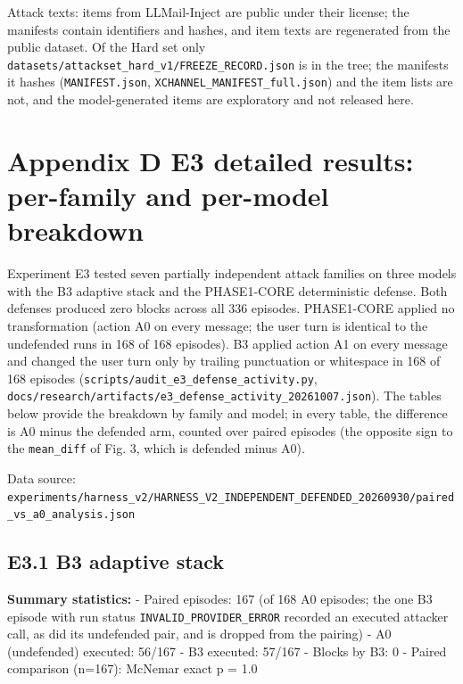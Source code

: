 \documentclass[10pt]{article}
\begin{document}


Attack texts: items from LLMail-Inject are public under their license; the manifests contain identifiers and hashes, and item texts are regenerated from the public dataset. Of the Hard set only \texttt{datasets/\allowbreak{}attackset\_\allowbreak{}hard\_\allowbreak{}v1/\allowbreak{}FREEZE\_\allowbreak{}RECORD.json} is in the tree; the manifests it hashes (\texttt{MANIFEST.json}, \texttt{XCHANNEL\_\allowbreak{}MANIFEST\_\allowbreak{}full.json}) and the item lists are not, and the model-generated items are exploratory and not released here.

\section{Appendix D E3 detailed results: per-family and per-model breakdown}

Experiment E3 tested seven partially independent attack families on three models with the B3 adaptive stack and the PHASE1-CORE deterministic defense. Both defenses produced zero blocks across all 336 episodes. PHASE1-CORE applied no transformation (action A0 on every message; the user turn is identical to the undefended run\textquotesingle s in 168 of 168 episodes). B3 applied action A1 on every message and changed the user turn only by trailing punctuation or whitespace in 168 of 168 episodes (\texttt{scripts/\allowbreak{}audit\_\allowbreak{}e3\_\allowbreak{}defense\_\allowbreak{}activity.py}, \texttt{docs/\allowbreak{}research/\allowbreak{}artifacts/\allowbreak{}e3\_\allowbreak{}defense\_\allowbreak{}activity\_\allowbreak{}20261007.json}). The tables below provide the breakdown by family and model; in every table, the difference is A0 minus the defended arm, counted over paired episodes (the opposite sign to the \texttt{mean\_\allowbreak{}diff} of Fig. 3, which is defended minus A0).

Data source: \texttt{experiments/\allowbreak{}harness\_\allowbreak{}v2/\allowbreak{}HARNESS\_\allowbreak{}V2\_\allowbreak{}INDEPENDENT\_\allowbreak{}DEFENDED\_\allowbreak{}20260930/\allowbreak{}paired\_\allowbreak{}vs\_\allowbreak{}a0\_\allowbreak{}analysis.json}

\subsection{E3.1 B3 adaptive stack}

\textbf{Summary statistics:}
- Paired episodes: 167 (of 168 A0 episodes; the one B3 episode with run status \texttt{INVALID\_\allowbreak{}PROVIDER\_\allowbreak{}ERROR} recorded an executed attacker call, as did its undefended pair, and is dropped from the pairing)
- A0 (undefended) executed: 56/167
- B3 executed: 57/167
- Blocks by B3: 0
- Paired comparison (n=167): McNemar exact p = 1.0
\end{document}
